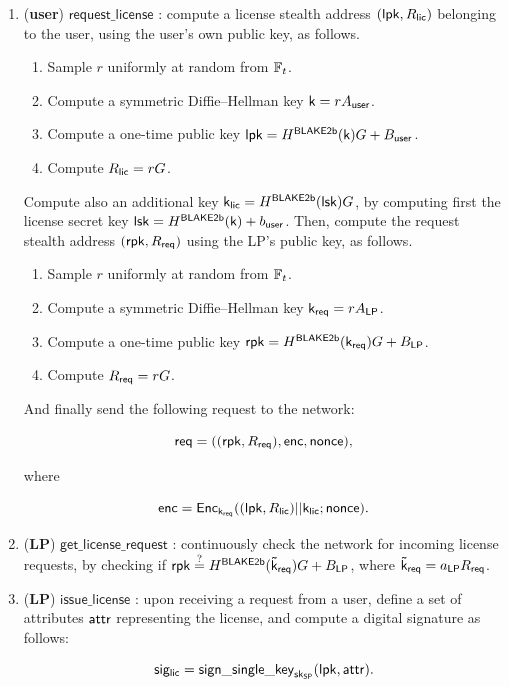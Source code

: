 \begin{enumerate}
	\item (\textbf{user}) $\mathsf{request\_license}$ : compute a license stealth address $(\mathsf{lpk}, R_{\mathsf{lic}})$ belonging to the user, using the user's own public key, as follows.

	\begin{enumerate}
		\item Sample $r$ uniformly at random from $\mathbb{F}_t$.
		\item Compute a symmetric Diffie--Hellman key $\mathsf{k} = rA_{\mathsf{user}}$.
		\item Compute a one-time public key $\mathsf{lpk} = H^\mathsf{BLAKE2b}(\mathsf{k})G + B_{\mathsf{user}}$.
		\item Compute $R_{\mathsf{lic}} = rG$.
	\end{enumerate}

	Compute also an additional key $\mathsf{k_{lic}} = H^\mathsf{BLAKE2b}(\mathsf{lsk})G$, by computing first the license secret key $\mathsf{lsk} = H^\mathsf{BLAKE2b}(\mathsf{k}) + b_{\mathsf{user}}$. Then, compute the request stealth address $(\mathsf{rpk}, R_{\mathsf{req}})$ using the LP's public key, as follows.

	\begin{enumerate}
		\item Sample $r$ uniformly at random from $\mathbb{F}_t$.
		\item Compute a symmetric Diffie--Hellman key $\mathsf{k_{req}} = rA_{\mathsf{LP}}$.
		\item Compute a one-time public key $\mathsf{rpk} = H^\mathsf{BLAKE2b}(\mathsf{k_{req}})G + B_{\mathsf{LP}}$.
		\item Compute $R_{\mathsf{req}} = rG$.
	\end{enumerate}

	And finally send the following request to the network:

		$$\mathsf{req} = ((\mathsf{rpk}, R_{\mathsf{req}}), \mathsf{enc}, \mathsf{nonce}),$$

	where 

		$$\mathsf{enc} = \mathsf{Enc}_{\mathsf{k_{req}}} ((\mathsf{lpk}, R_{\mathsf{lic}})||\mathsf{k_{lic}}; \mathsf{nonce}).$$


	\item (\textbf{LP}) $\mathsf{get\_license\_request}$ : continuously check the network for incoming license requests, by checking if $\mathsf{rpk} \stackrel{?}{=} H^\mathsf{BLAKE2b}(\mathsf{\tilde{k}_{req}}) G + B_{\mathsf{LP}}$, where $\mathsf{\tilde{k}_{req}} = a_{\mathsf{LP}}R_{\mathsf{req}}$.

	\item (\textbf{LP}) $\mathsf{issue\_license}$ : upon receiving a request from a user, define a set of attributes $\mathsf{attr}$ representing the license, and compute a digital signature as follows:

		$$\mathsf{sig_{lic}} = \mathsf{sign\_single\_key}_{\mathsf{sk}_{\mathsf{SP}}}(\mathsf{lpk}, \mathsf{attr}).$$


\end{enumerate}
